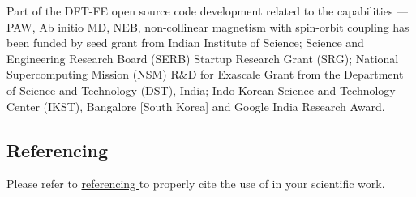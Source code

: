 Part of the DFT-FE open source code development related to the capabilities --- PAW, Ab initio MD, NEB, non-collinear magnetism with spin-orbit coupling has been funded by seed grant from Indian Institute of Science; Science and Engineering Research Board (SERB) Startup Research Grant (SRG); National Supercomputing Mission (NSM) R\&D for Exascale Grant from the Department of Science and Technology (DST), India; Indo-Korean Science and Technology Center (IKST), Bangalore [South Korea] and Google India Research Award.

\subsection{Referencing \dftfe{}}
Please refer to \href{https://sites.google.com/umich.edu/dftfe/referencing}{referencing  \dftfe{}} to properly cite the use of 
\dftfe{} in your scientific work. 
